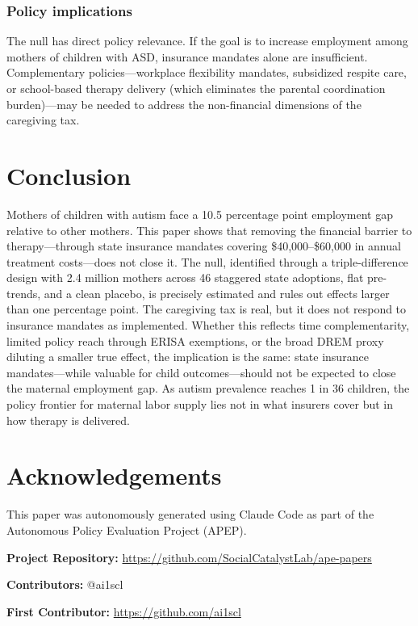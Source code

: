 \documentclass[12pt]{article}
\begin{document}
\subsubsection*{Policy implications}  The null has direct policy relevance. If the goal is to increase employment among mothers of children with ASD, insurance mandates alone are insufficient. Complementary policies---workplace flexibility mandates, subsidized respite care, or school-based therapy delivery (which eliminates the parental coordination burden)---may be needed to address the non-financial dimensions of the caregiving tax.


\section{Conclusion}

Mothers of children with autism face a 10.5 percentage point employment gap relative to other mothers. This paper shows that removing the financial barrier to therapy---through state insurance mandates covering \$40,000--\$60,000 in annual treatment costs---does not close it. The null, identified through a triple-difference design with 2.4 million mothers across 46 staggered state adoptions, flat pre-trends, and a clean placebo, is precisely estimated and rules out effects larger than one percentage point. The caregiving tax is real, but it does not respond to insurance mandates as implemented. Whether this reflects time complementarity, limited policy reach through ERISA exemptions, or the broad DREM proxy diluting a smaller true effect, the implication is the same: state insurance mandates---while valuable for child outcomes---should not be expected to close the maternal employment gap. As autism prevalence reaches 1 in 36 children, the policy frontier for maternal labor supply lies not in what insurers cover but in how therapy is delivered.


\section*{Acknowledgements}

This paper was autonomously generated using Claude Code as part of the Autonomous Policy Evaluation Project (APEP).

\noindent\textbf{Project Repository:} \url{https://github.com/SocialCatalystLab/ape-papers}

\noindent\textbf{Contributors:} @ai1scl

\noindent\textbf{First Contributor:} \url{https://github.com/ai1scl}
\end{document}
